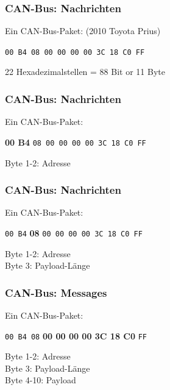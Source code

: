 \documentclass[t]{beamer}
\begin{document}
\begin{frame}
	\frametitle{CAN-Bus: Nachrichten}
    Ein CAN-Bus-Paket: (2010 Toyota Prius)
    \newline
    \newline
    \newline
    \newline
    {\Large \centerline{\texttt{00 B4 08 00 00 00 00 3C 18 C0 FF}}}
    \vspace*{1cm}

    22 Hexadezimalstellen = 88 Bit or 11 Byte
\end{frame}

\begin{frame}
	\frametitle{CAN-Bus: Nachrichten}
    Ein CAN-Bus-Paket:
    \newline
    \newline
    \newline
    \newline
    {\Large \centerline{\textbf{00 B4} \texttt{08 00 00 00 00 3C 18 C0 FF}}}
    \vspace*{1cm}

    Byte 1-2: Adresse
\end{frame}

\begin{frame}
	\frametitle{CAN-Bus: Nachrichten}
    Ein CAN-Bus-Paket:
    \newline
    \newline
    \newline
    \newline
    {\Large \centerline{\texttt{00 B4} \textbf{08} \texttt{00 00 00 00 3C 18 C0 FF}}}
    \vspace*{1cm}

    Byte 1-2: Adresse \\
    Byte 3: Payload-Länge
\end{frame}

\begin{frame}
	\frametitle{CAN-Bus: Messages}
    Ein CAN-Bus-Paket:
    \newline
    \newline
    \newline
    \newline
{\Large \centerline{\texttt{00 B4 08} \textbf{00 00 00 00 3C 18 C0} \texttt{FF}}}
    \vspace*{1cm}

    Byte 1-2: Adresse \\
    Byte 3: Payload-Länge \\
    Byte 4-10: Payload
\end{frame}
\end{document}

